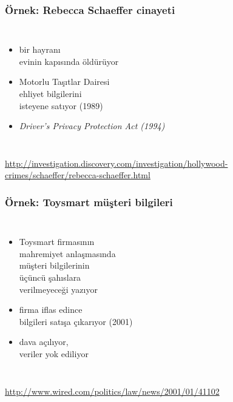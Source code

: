 \documentclass[dvipsnames]{beamer}
\theoremstyle{definition}
\theoremstyle{example}
\theoremstyle{plain}
\begin{document}
\begin{frame}
  \frametitle{Örnek: Rebecca Schaeffer cinayeti}

  \begin{columns}

    \begin{itemize}
      \item bir hayranı\\
        evinin kapısında öldürüyor
      \item Motorlu Taşıtlar Dairesi\\
        ehliyet bilgilerini\\
        isteyene satıyor (1989)

      \pause
      \medskip
      \item \emph{Driver's Privacy Protection Act (1994)}
    \end{itemize}
  \end{columns}

  \medskip
  \tiny{\url{http://investigation.discovery.com/investigation/hollywood-crimes/schaeffer/rebecca-schaeffer.html}}\\
\end{frame}

\begin{frame}
  \frametitle{Örnek: Toysmart müşteri bilgileri}

  \begin{columns}

    \begin{itemize}
      \item Toysmart firmasının\\
        mahremiyet anlaşmasında\\
        müşteri bilgilerinin\\
        üçüncü şahıslara\\
        verilmeyeceği yazıyor
      \item firma iflas edince\\bilgileri satışa çıkarıyor (2001)
      \item dava açılıyor,\\
        veriler yok ediliyor
    \end{itemize}
  \end{columns}

  \medskip
  \tiny{\url{http://www.wired.com/politics/law/news/2001/01/41102}}\\
\end{frame}
\end{document}
